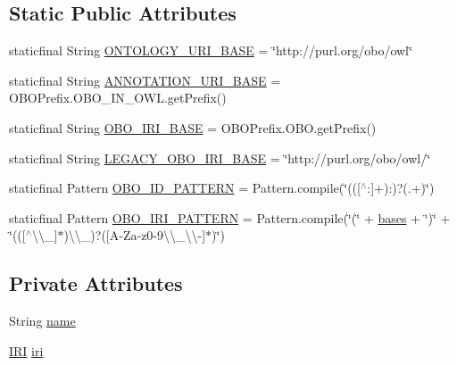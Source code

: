 \subsection*{Static Public Attributes}
\begin{DoxyCompactItemize}
\item 
staticfinal String \hyperlink{enumorg_1_1coode_1_1owlapi_1_1obo_1_1parser_1_1_o_b_o_vocabulary_aba55026a762172d8705d240c066d429f}{O\-N\-T\-O\-L\-O\-G\-Y\-\_\-\-U\-R\-I\-\_\-\-B\-A\-S\-E} = \char`\"{}http\-://purl.\-org/obo/owl\char`\"{}
\item 
staticfinal String \hyperlink{enumorg_1_1coode_1_1owlapi_1_1obo_1_1parser_1_1_o_b_o_vocabulary_a4566a0b5e099a30e286d9cc4d282e1e8}{A\-N\-N\-O\-T\-A\-T\-I\-O\-N\-\_\-\-U\-R\-I\-\_\-\-B\-A\-S\-E} = O\-B\-O\-Prefix.\-O\-B\-O\-\_\-\-I\-N\-\_\-\-O\-W\-L.\-get\-Prefix()
\item 
staticfinal String \hyperlink{enumorg_1_1coode_1_1owlapi_1_1obo_1_1parser_1_1_o_b_o_vocabulary_a100cf24365c118368a03588b58fe2c7d}{O\-B\-O\-\_\-\-I\-R\-I\-\_\-\-B\-A\-S\-E} = O\-B\-O\-Prefix.\-O\-B\-O.\-get\-Prefix()
\item 
staticfinal String \hyperlink{enumorg_1_1coode_1_1owlapi_1_1obo_1_1parser_1_1_o_b_o_vocabulary_afb4c3633766d7eb79ce6ff7334e64558}{L\-E\-G\-A\-C\-Y\-\_\-\-O\-B\-O\-\_\-\-I\-R\-I\-\_\-\-B\-A\-S\-E} = \char`\"{}http\-://purl.\-org/obo/owl/\char`\"{}
\item 
staticfinal Pattern \hyperlink{enumorg_1_1coode_1_1owlapi_1_1obo_1_1parser_1_1_o_b_o_vocabulary_ae369c8df10dc1141b4bec755944425ce}{O\-B\-O\-\_\-\-I\-D\-\_\-\-P\-A\-T\-T\-E\-R\-N} = Pattern.\-compile(\char`\"{}((\mbox{[}$^\wedge$\-:\mbox{]}+)\-:)?(.+)\char`\"{})
\item 
staticfinal Pattern \hyperlink{enumorg_1_1coode_1_1owlapi_1_1obo_1_1parser_1_1_o_b_o_vocabulary_aefd704b1c8e0d9fd936247e2faaaabb0}{O\-B\-O\-\_\-\-I\-R\-I\-\_\-\-P\-A\-T\-T\-E\-R\-N} = Pattern.\-compile(\char`\"{}(\char`\"{} + \hyperlink{enumorg_1_1coode_1_1owlapi_1_1obo_1_1parser_1_1_o_b_o_vocabulary_ac2d49a08cf8835e23dd5dc77c1567dad}{bases} + \char`\"{})\char`\"{} + \char`\"{}((\mbox{[}$^\wedge$\textbackslash{}\textbackslash{}\-\_\-\mbox{]}$\ast$)\textbackslash{}\textbackslash{}\-\_\-)?(\mbox{[}A-\/Za-\/z0-\/9\textbackslash{}\textbackslash{}\-\_\-\textbackslash{}\textbackslash{}-\/\mbox{]}$\ast$)\char`\"{})
\end{DoxyCompactItemize}
\subsection*{Private Attributes}
\begin{DoxyCompactItemize}
\item 
String \hyperlink{enumorg_1_1coode_1_1owlapi_1_1obo_1_1parser_1_1_o_b_o_vocabulary_aa517e398dd695da1c02e9f0adf61e4b3}{name}
\item 
\hyperlink{classorg_1_1semanticweb_1_1owlapi_1_1model_1_1_i_r_i}{I\-R\-I} \hyperlink{enumorg_1_1coode_1_1owlapi_1_1obo_1_1parser_1_1_o_b_o_vocabulary_ac855b560d6023d8821e99bfba2adfc6f}{iri}
\end{DoxyCompactItemize}
